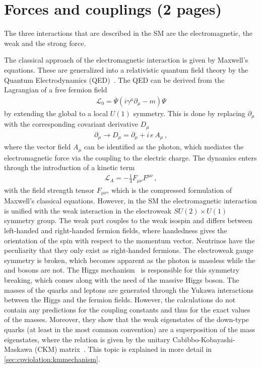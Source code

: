 
\section{Forces and couplings (2 pages)}
\label{sec:standardmodel:forces}

The three interactions that are described in the SM are the electromagnetic,
the weak and the strong force.

The classical approach of the electromagnetic interaction is given by
Maxwell's equations. These are generalized into a relativistic quantum field
theory by the Quantum Electrodynamics
(QED)~\cite{Tomonaga01081946,Schwinger-QED1,*Schwinger-QED2,Feynman-QED1,*Feynman-QED2,*Feynman-QED3}.
The QED can be derived from the Lagrangian of a free fermion field
\begin{align}
	\mathcal{L}_0 = \overline{\Psi} (i\gamma^\mu \partial_\mu - m) \Psi
\end{align}
by extending the global to a local $U(1)$ symmetry. This is done by replacing
$\partial_\mu$ with the corresponding covariant derivative $D_\mu$
\begin{align}
	\partial_\mu \to D_\mu = \partial_\mu + i\,e\,A_\mu\,,
\end{align}
where the vector field $A_\mu$ can be identified as the photon, which mediates
the electromagnetic force via the coupling to the electric charge. The
dynamics enters through the introduction of a kinetic term
\begin{align}
	\mathcal{L}_A = - \frac 14 F_{\mu\nu}F^{\mu\nu}\,,
\end{align}
with the field strength tensor $F_{\mu\nu}$, which is the compressed
formulation of Maxwell's classical equations. However, in the SM the
electromagnetic interaction is unified with the weak interaction in the
electroweak $SU(2)\times U(1)$ symmetry group. The weak part couples to the
weak isospin and differs between left-handed and right-handed fermion fields,
where handedness gives the orientation of the spin with respect to the
momentum vector. Neutrinos have the peculiarity that they only exist as
right-handed fermions. The electroweak gauge symmetry is broken, which becomes
apparent as the photon is massless while the \Wpm and \Z bosons are not. The
Higgs mechanism~\cite{Higgs:1964pj} is responsible for this symmetry breaking,
which comes along with the need of the massive Higgs boson. The masses of the
quarks and leptons are generated through the Yukawa interactions between the
Higgs and the fermion fields. However, the calculations do not contain any
predictions for the coupling constants and thus for the exact values of the
masses. Moreover, they show that the weak eigenstates of the down-type quarks
(at least in the most common convention) are a superposition of the mass
eigenstates, where the relation is given by the unitary
Cabibbo-Kobayashi-Maskawa (CKM) matrix~\cite{Kobayashi:1973fv}. This topic is
explained in more detail in \cref{sec:cpviolation:kmmechanism}.

